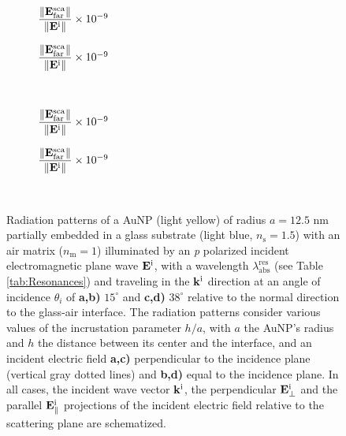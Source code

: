 \begin{figure}[b!]
    \centering
    \def\svgwidth{.8\textwidth}
    \\[-16.5em]
    \hspace*{-.2\textwidth}%
        \begin{subfigure}{.375\textwidth}\caption{%
                    \footnotesize$\dfrac{\norm{\vb{E}^\text{sca}_\text{far}}}{\norm{\vb{E}^\text{i}}} \times 10^{-9}$  }\label{sfig:Far:Inc:p1:a}\end{subfigure}%
        \begin{subfigure}{.4\textwidth}\caption{%
                    \footnotesize$\dfrac{\norm{\vb{E}^\text{sca}_\text{far}}}{\norm{\vb{E}^\text{i}}} \times 10^{-9}$  }\label{sfig:Far:Inc:p1:b}\end{subfigure}\\[13.75em]
    \def\svgwidth{.8\textwidth}
    \hspace*{-.21\textwidth}%
    \vspace*{-.7em}%
        \begin{subfigure}{.4\textwidth}\caption{%
                    \footnotesize$\dfrac{\norm{\vb{E}^\text{sca}_\text{far}}}{\norm{\vb{E}^\text{i}}} \times 10^{-9}$  }\label{sfig:Far:Inc:p1:c}\end{subfigure}%
        \begin{subfigure}{.4\textwidth}\caption{%
                    \footnotesize$\dfrac{\norm{\vb{E}^\text{sca}_\text{far}}}{\norm{\vb{E}^\text{i}}} \times 10^{-9}$  }\label{sfig:Far:Inc:p1:d}\end{subfigure}\\
    \caption[  Radiation pattern of a AuNP supported on a substrate illuminated at oblique incidence ]{
    Radiation patterns of a AuNP (light yellow) of radius $a = 12.5$ nm partially embedded in a glass substrate (light blue, $n_\text{s} = 1.5$) with an air matrix ($n_\text{m} = 1$) illuminated by an \textit{p} polarized incident electromagnetic plane wave $\vb{E}^\text{i}$, with a wavelength $\lambda_\text{abs}^\text{res}$ (see Table \ref{tab:Resonances}) and traveling in the $\vb{k}^\text{i}$ direction at an angle of incidence $\theta_i$ of \textbf{a,b)} $15^\circ$ and \textbf{c,d)} $38^\circ$ relative to the normal direction to the glass-air interface. The radiation patterns consider various values of the incrustation parameter $h/a$, with $a$ the AuNP's radius and $h$ the distance between its center and the interface, and an  incident electric field \textbf{a,c)} perpendicular to the incidence plane (vertical gray dotted lines) and \textbf{b,d)} equal to the incidence plane. In all cases, the incident wave vector $\vb{k}^\text{i}$, the perpendicular $\vb{E}_\perp^\text{i}$ and the  parallel $\vb{E}_\parallel^\text{i}$ projections of the incident electric field relative to the scattering plane are schematized.%
    }
    \label{fig:Far:Inc:p1}
\end{figure}


